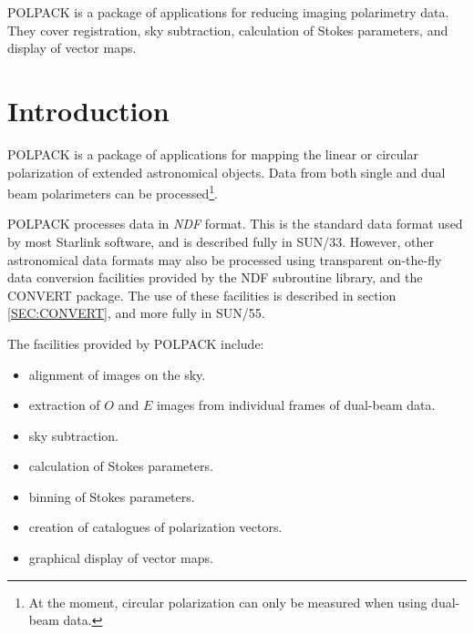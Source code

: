 \documentclass[twoside,11pt]{article}
\newcommand{\stardocinitials}  {SUN}
\newcommand{\stardocnumber}    {223.3}
\newcommand{\stardocabstract}  {POLPACK is a package of applications for 
reducing imaging polarimetry data. They cover registration, sky subtraction, 
calculation of Stokes parameters, and display of vector maps.}
\newcommand{\stardocname}{\stardocinitials /\stardocnumber}
\newcommand{\hyperref}[4]{#2\ref{#4}#3}
\newenvironment{latexonly}{}{}
\newcommand{\xref}[3]{#1}
\newcommand{\xlabel}[1]{}
\renewcommand{\_}{\texttt{\symbol{95}}}
\renewcommand{\thepage}{\roman{page}}
\begin{document}
\stardocabstract
  \newpage
  \begin{latexonly}
    \setlength{\parskip}{0mm}
    \tableofcontents
    \setlength{\parskip}{\medskipamount}
    \markboth{\stardocname}{\stardocname}
  \end{latexonly}
\cleardoublepage
\renewcommand{\thepage}{\arabic{page}}
\setcounter{page}{1}

\section{\xlabel{introduction}Introduction}
POLPACK is a package of applications for mapping the linear or circular
polarization of extended astronomical objects. Data from both single and
dual beam polarimeters can be processed\footnote{At the moment, circular
polarization can only be measured when using dual-beam data.}.

POLPACK processes data in \emph{NDF} format. This is the standard data
format used by most Starlink software, and is described fully in
\xref{SUN/33}{sun33}{}. However, other astronomical data formats may also
be processed using transparent on-the-fly data conversion facilities
provided by the NDF subroutine library, and the CONVERT package. The use of 
these facilities is described \hyperref{here}{in section }{}{SEC:CONVERT},
and more fully in \xref{SUN/55}{sun55}{}.

The facilities provided by POLPACK include:
\begin{itemize}
\item alignment of images on the sky.
\item extraction of $O$ and $E$ images from individual frames of dual-beam
data.
\item sky subtraction.
\item calculation of Stokes parameters.
\item binning of Stokes parameters.
\item creation of catalogues of polarization vectors.
\item graphical display of vector maps.
\end{itemize}
\end{document}

